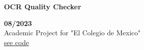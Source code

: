 \begin{minipage}{0.8\textwidth}
    \parbox{0.8\linewidth}{\textbf{OCR Quality Checker}}  \hfill  \textbf{08/2023}\\
    Academic Project for "El Colegio de Mexico"\\
    \href{https://github.com/JavierOramas/OCR-quality-Check}{see code}\\
    \end{minipage} \hfill {}\\\\

